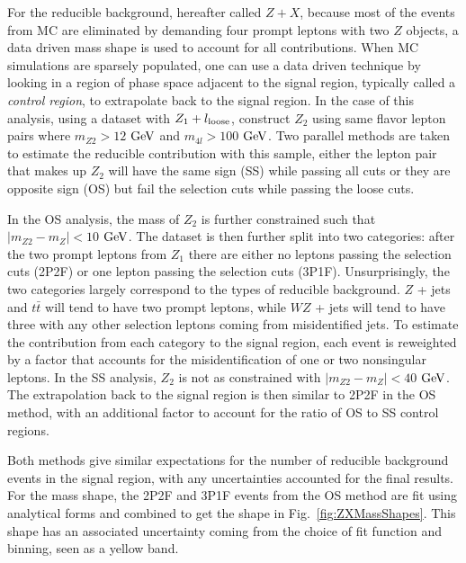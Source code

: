 For the reducible background, hereafter called $Z+X$, because most of the events from MC are eliminated by demanding four prompt leptons with two $Z$ objects, a data driven mass shape is used to account for all contributions. When MC simulations are sparsely populated, one can use a data driven technique by looking in a region of phase space adjacent to the signal region, typically called a \textit{control region}, to extrapolate back to the signal region. In the case of this analysis, using a dataset with $Z_1 + l_{\rm{loose}}$, construct $Z_2$ using same flavor lepton pairs where $m_{Z2} > 12$ $\rm{GeV}$ and $m_{4l} > 100$ $\rm{GeV}$. Two parallel methods are taken to estimate the reducible contribution with this sample, either the lepton pair that makes up $Z_2$ will have the same sign (SS) while passing all cuts or they are opposite sign (OS) but fail the selection cuts while passing the loose cuts. 

In the OS analysis, the mass of $Z_2$ is further constrained such that $|m_{Z2}-m_Z|<10$ $\rm{GeV}$. The dataset is then further split into two categories: after the two prompt leptons from $Z_1$ there are either no leptons passing the selection cuts (2P2F) or one lepton passing the selection cuts (3P1F). Unsurprisingly, the two categories largely correspond to the types of reducible background. $Z$ + jets and $t\bar{t}$ will tend to have two prompt leptons, while $WZ$ + jets will tend to have three with any other selection leptons coming from misidentified jets. To estimate the contribution from each category to the signal region, each event is reweighted by a factor that accounts for the misidentification of one or two nonsingular leptons. In the SS analysis, $Z_2$ is not as constrained with $|m_{Z2}-m_Z|<40$ $\rm{GeV}$. The extrapolation back to the signal region is then similar to 2P2F in the OS method, with an additional factor to account for the ratio of OS to SS control regions.

Both methods give similar expectations for the number of reducible background events in the signal region, with any uncertainties accounted for the final results. For the mass shape, the 2P2F and 3P1F events from the OS method are fit using analytical forms and combined to get the shape in Fig.~\ref{fig:ZXMassShapes}. This shape has an associated uncertainty coming from the choice of fit function and binning, seen as a yellow band.

